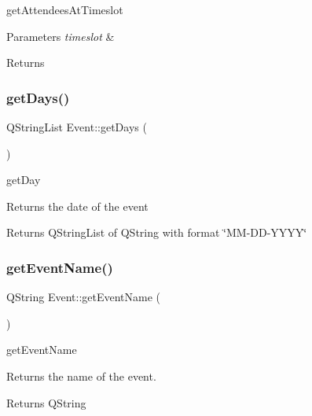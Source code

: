 get\+Attendees\+At\+Timeslot 


\begin{DoxyParams}{Parameters}
{\em timeslot} & \\
\hline
\end{DoxyParams}
\begin{DoxyReturn}{Returns}

\end{DoxyReturn}
\mbox{\label{class_event_ac8aac8eac691a08cf0822a380fe29eb2}} 
\subsubsection{\texorpdfstring{get\+Days()}{getDays()}}
{\footnotesize\ttfamily Q\+String\+List Event\+::get\+Days (\begin{DoxyParamCaption}{ }\end{DoxyParamCaption})}



get\+Day 

Returns the date of the event \begin{DoxyReturn}{Returns}
Q\+String\+List of Q\+String with format \char`\"{}\+M\+M-\/\+D\+D-\/\+Y\+Y\+Y\+Y\char`\"{} 
\end{DoxyReturn}
\mbox{\label{class_event_a2846f2dfad84c083d829fdf3d915c05a}} 
\subsubsection{\texorpdfstring{get\+Event\+Name()}{getEventName()}}
{\footnotesize\ttfamily Q\+String Event\+::get\+Event\+Name (\begin{DoxyParamCaption}{ }\end{DoxyParamCaption})}



get\+Event\+Name 

Returns the name of the event. \begin{DoxyReturn}{Returns}
Q\+String 
\end{DoxyReturn}
\mbox{\label{class_event_a019343d5fbe993108f49362f134ef746}} 
